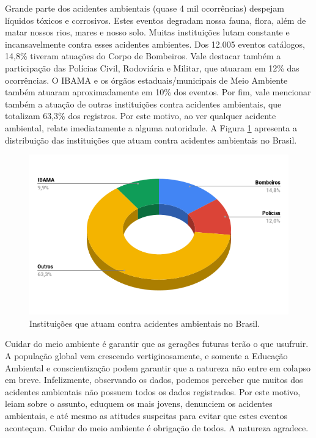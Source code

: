 

Grande parte dos acidentes ambientais (quase 4 mil ocorrências) despejam líquidos tóxicos e corrosivos. Estes eventos degradam nossa fauna, flora, além de matar nossos rios, mares e nosso solo. Muitas instituições lutam constante e incansavelmente contra esses acidentes ambientes. Dos 12.005 eventos catálogos, 14,8\% tiveram atuações do Corpo de Bombeiros. Vale destacar também a participação das Polícias Civil, Rodoviária e Militar, que atuaram em 12\% das ocorrências. O IBAMA e os órgãos estaduais/municipais de Meio Ambiente também atuaram aproximadamente em 10\% dos eventos. Por fim, vale mencionar também a atuação de outras instituições contra acidentes ambientais, que totalizam 63,3\% dos registros. Por este motivo, ao ver qualquer acidente ambiental, relate imediatamente a alguma autoridade. A Figura \ref{fig:quematua} apresenta a distribuição das instituições que atuam contra acidentes ambientais no Brasil.

\begin{figure}[!h]
    \includegraphics[scale=0.6]{fig/quematua.png}
    \centering
    \caption{Instituições que atuam contra acidentes ambientais no Brasil.}
    \label{fig:quematua}
\end{figure}


Cuidar do meio ambiente é garantir que as gerações futuras terão o que usufruir. A população global vem crescendo vertiginosamente, e somente a Educação Ambiental \cite{reigota2017educaccao} e conscientização podem garantir que a natureza não entre em colapso em breve. Infelizmente, observando os dados, podemos perceber que muitos dos acidentes ambientais não possuem todos os dados registrados. Por este motivo, leiam sobre o assunto, eduquem os mais jovens, denunciem os acidentes ambientais, e até mesmo as atitudes suspeitas para evitar que estes eventos aconteçam. Cuidar do meio ambiente é obrigação de todos. A natureza agradece.

